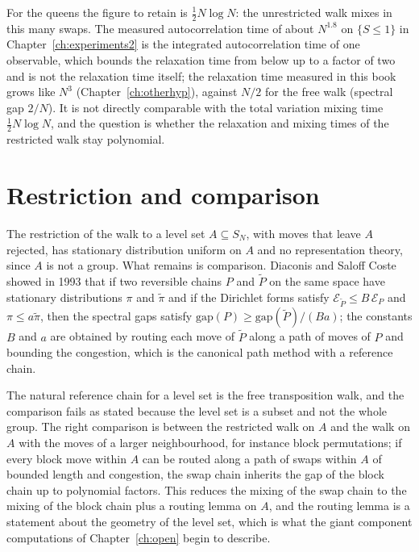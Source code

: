 For the queens the figure to retain is $\tfrac12 N \log N$: the unrestricted walk mixes in this many swaps. The measured autocorrelation time of about $N^{1.8}$ on $\{ S \le 1 \}$ in Chapter~\ref{ch:experiments2} is the integrated autocorrelation time of one observable, which bounds the relaxation time from below up to a factor of two and is not the relaxation time itself; the relaxation time measured in this book grows like $N^3$ (Chapter~\ref{ch:otherhyp}), against $N/2$ for the free walk (spectral gap $2/N$). It is not directly comparable with the total variation mixing time $\tfrac12 N \log N$, and the question is whether the relaxation and mixing times of the restricted walk stay polynomial.

\section{Restriction and comparison}

The restriction of the walk to a level set $A \subseteq S_N$, with moves that leave $A$ rejected, has stationary distribution uniform on $A$ and no representation theory, since $A$ is not a group. What remains is comparison. Diaconis and Saloff Coste showed in 1993 that if two reversible chains $P$ and $\tilde P$ on the same space have stationary distributions $\pi$ and $\tilde\pi$ and if the Dirichlet forms satisfy $\mathcal{E}_{\tilde P} \le B \, \mathcal{E}_P$ and $\pi \le a \tilde\pi$, then the spectral gaps satisfy $\mathrm{gap}(P) \ge \mathrm{gap}(\tilde P) / (B a)$; the constants $B$ and $a$ are obtained by routing each move of $\tilde P$ along a path of moves of $P$ and bounding the congestion, which is the canonical path method with a reference chain.

The natural reference chain for a level set is the free transposition walk, and the comparison fails as stated because the level set is a subset and not the whole group. The right comparison is between the restricted walk on $A$ and the walk on $A$ with the moves of a larger neighbourhood, for instance block permutations; if every block move within $A$ can be routed along a path of swaps within $A$ of bounded length and congestion, the swap chain inherits the gap of the block chain up to polynomial factors. This reduces the mixing of the swap chain to the mixing of the block chain plus a routing lemma on $A$, and the routing lemma is a statement about the geometry of the level set, which is what the giant component computations of Chapter~\ref{ch:open} begin to describe.

